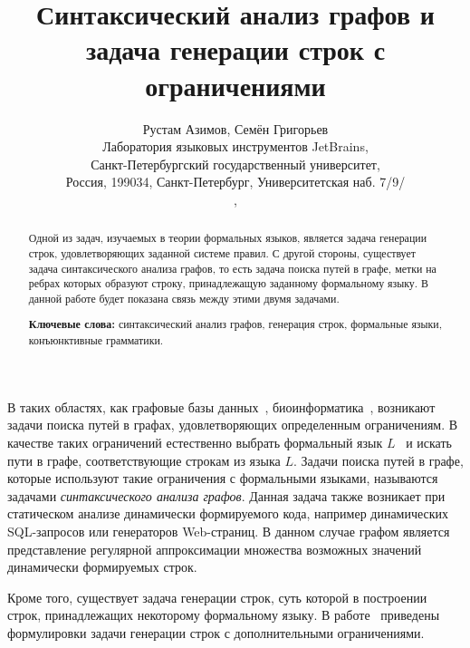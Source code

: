 \documentclass[10pt]{article}
\begin{document}
\title{Синтаксический анализ графов и задача генерации строк с ограничениями}
\author{Рустам Азимов, Семён Григорьев \\ 
Лаборатория языковых инструментов JetBrains, \\
Санкт-Петербургский государственный университет, \\
Россия, 199034, Санкт-Петербург, Университетская наб. 7/9/ \\ 
, 
}

\maketitle

\begin{abstract}
Одной из задач, изучаемых в теории формальных языков, является задача генерации строк, удовлетворяющих заданной системе правил. С другой стороны, существует задача синтаксического анализа графов, то есть задача поиска путей в графе, метки на ребрах которых образуют строку, принадлежащую заданному формальному языку. В данной работе будет показана связь между этими двумя задачами.

\vspace{1em}
\textbf{Ключевые слова:} синтаксический анализ графов, генерация строк, формальные языки, конъюнктивные грамматики.

\end{abstract}

В таких областях, как графовые базы данных~\cite{azimov-spbu-graphDB, azimov-spbu-zhang}, биоинформатика~\cite{azimov-spbu-Anderson}, возникают задачи поиска путей в графах, удовлетворяющих определенным ограничениям. В качестве таких ограничений естественно выбрать формальный язык $L$~\cite{azimov-spbu-barrett} и искать пути в графе, соответствующие строкам из языка $L$. Задачи поиска путей в графе, которые используют такие ограничения с формальными языками, называются задачами \textit{синтаксического анализа графов}. Данная задача также возникает при статическом анализе динамически формируемого кода, например динамических SQL-запросов или генераторов Web-страниц. В данном случае графом является представление регулярной аппроксимации множества возможных значений динамически формируемых строк.

Кроме того, существует задача генерации строк, суть которой в построении строк, принадлежащих некоторому формальному языку. В работе~\cite{azimov-spbu-Okhotin} приведены формулировки задачи генерации строк с дополнительными ограничениями.
\end{document}
